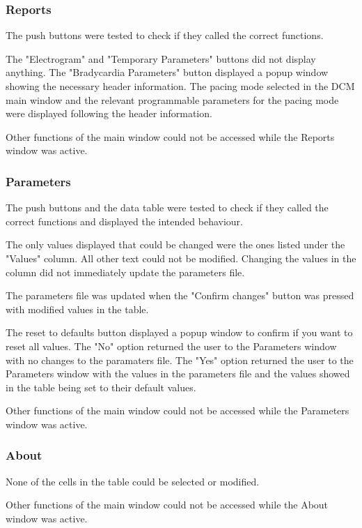 \documentclass[12pt]{article}
\begin{document}
\subsubsection{Reports}\label{Testing:Reports}
The push buttons were tested to check if they called the correct functions.

The "Electrogram" and "Temporary Parameters" buttons did not display anything. The "Bradycardia Parameters" button displayed a popup window showing the necessary header information. The pacing mode selected in the DCM main window and the relevant programmable parameters for the pacing mode were displayed following the header information.

Other functions of the main window could not be accessed while the Reports window was active.

\subsubsection{Parameters}\label{Testing:Parameters}
The push buttons and the data table were tested to check if they called the correct functions and displayed the intended behaviour.

The only values displayed that could be changed were the ones listed under the "Values" column. All other text could not be modified. Changing the values in the column did not immediately update the parameters file.

The parameters file was updated when the "Confirm changes" button was pressed with modified values in the table.

The reset to defaults button displayed a popup window to confirm if you want to reset all values. The "No" option returned the user to the Parameters window with no changes to the paramaters file. The "Yes" option returned the user to the Parameters window with the values in the parameters file and the values showed in the table being set to their default values.

Other functions of the main window could not be accessed while the Parameters window was active.

\subsubsection{About}
None of the cells in the table could be selected or modified.

Other functions of the main window could not be accessed while the About window was active.
\end{document}
